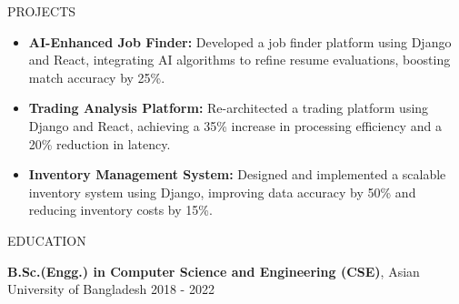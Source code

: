 \documentclass{resume} %
\begin{document}
\begin{rSection}{PROJECTS}

\begin{itemize}
    \item \textbf{AI-Enhanced Job Finder:} Developed a job finder platform using Django and React, integrating AI algorithms to refine resume evaluations, boosting match accuracy by 25\%.
    \item \textbf{Trading Analysis Platform:} Re-architected a trading platform using Django and React, achieving a 35\% increase in processing efficiency and a 20\% reduction in latency.
    \item \textbf{Inventory Management System:} Designed and implemented a scalable inventory system using Django, improving data accuracy by 50\% and reducing inventory costs by 15\%.
\end{itemize}

\end{rSection} 


\begin{rSection}{EDUCATION}

{\bf B.Sc.(Engg.) in Computer Science and Engineering (CSE)}, Asian University of Bangladesh \hfill {2018 - 2022}

\end{rSection}





\end{document}
